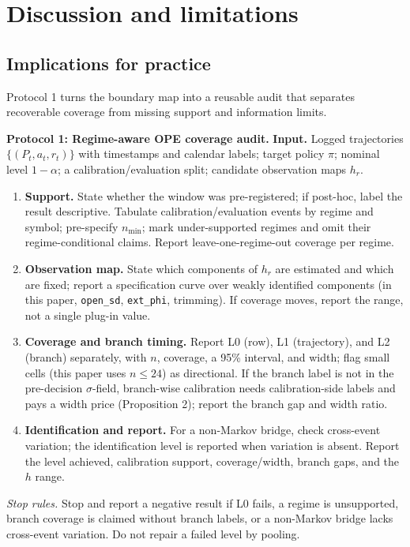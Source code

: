 \section{Discussion and limitations}

\subsection{Implications for practice}

Protocol 1 turns the boundary map into a reusable audit that separates recoverable coverage from missing support and information limits.

\small
\noindent\textbf{Protocol 1: Regime-aware OPE coverage audit.}
\textbf{Input.} Logged trajectories $\{(P_t,a_t,r_t)\}$ with timestamps and calendar labels; target policy $\pi$; nominal level $1-\alpha$; a calibration/evaluation split; candidate observation maps $h_r$.

\begin{enumerate}
\item \textbf{Support.} State whether the window was pre-registered; if post-hoc, label the result descriptive. Tabulate calibration/evaluation events by regime and symbol; pre-specify $n_{\min}$; mark under-supported regimes and omit their regime-conditional claims. Report leave-one-regime-out coverage per regime.
\item \textbf{Observation map.} State which components of $h_r$ are estimated and which are fixed; report a specification curve over weakly identified components (in this paper, \texttt{open\_sd}, \texttt{ext\_phi}, trimming). If coverage moves, report the range, not a single plug-in value.
\item \textbf{Coverage and branch timing.} Report L0 (row), L1 (trajectory), and L2 (branch) separately, with $n$, coverage, a 95\% interval, and width; flag small cells (this paper uses $n\leq 24$) as directional. If the branch label is not in the pre-decision $\sigma$-field, branch-wise calibration needs calibration-side labels and pays a width price (Proposition 2); report the branch gap and width ratio.
\item \textbf{Identification and report.} For a non-Markov bridge, check cross-event variation; the identification level is reported when variation is absent. Report the level achieved, calibration support, coverage/width, branch gaps, and the $h$ range.
\end{enumerate}

\textit{Stop rules.} Stop and report a negative result if L0 fails, a regime is unsupported, branch coverage is claimed without branch labels, or a non-Markov bridge lacks cross-event variation. Do not repair a failed level by pooling.
\normalsize


